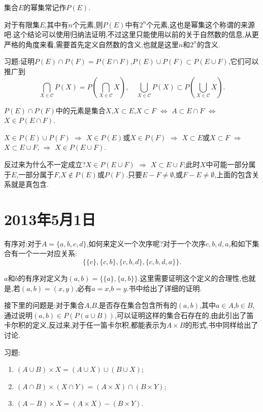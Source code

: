 \documentclass[12pt,a4paper,openany]{book}
\begin{document}
集合$E$的幂集常记作$P(E)$.

对于有限集$E$,其中有$n$个元素,则$P(E)$中有$2^n$个元素,这也是幂集这个称谓的来源吧.这个结论可以使用归纳法证明,不过这里只能使用以前的关于自然数的信息,从更严格的角度来看,需要首先定义自然数的含义,也就是这里$n$和$2^n$的含义.

习题:证明$P(E) \cap P(F) = P(E \cap F)$,$P(E) \cup P(F) \subset P(E \cup F)$,它们可以推广到
\[
\bigcap_{X \in \mathscr{C}}{P(X)} = P(\bigcap_{X \in \mathscr{C}}{X}),\quad \bigcup_{X \in \mathscr{C}}{P(X)} \subset P(\bigcup_{X \in \mathscr{C}}{X}).
\]

$P(E) \cap P(F)$中的元素是集合$X$,$X \subset E$,$X \subset F$ $\Leftrightarrow$ $A \subset E \cap F$ $\Leftrightarrow$ $X \in P(E \cap F)$.

$X \in P(E) \cup P(F)$ $\Rightarrow$ $X \in P(E)$或$X \in P(F)$ $\Rightarrow$ $X \subset E$或$X \subset F$ $\Rightarrow$ $X \subset E \cup F$, $\Rightarrow$ $X \in P(E \cup F)$.

反过来为什么不一定成立?$X \in P(E \cup F)$ $\Rightarrow$ $X \subset E \cup F$;此时$X$中可能一部分属于$E$,一部分属于$F$,$X \notin P(E)$或$P(F)$.只要$E-F\neq \emptyset$,或$F-E \neq \emptyset$,上面的包含关系就是真包含.

\section{2013年5月1日}
有序对:对于$A=\{a,b,c,d\}$,如何来定义一个次序呢?对于一个次序$c,b,d,a$,和如下集合有一个一一对应关系:
\[
\{\{c\},\{c,b\},\{c,b,d\},\{c,b,d,a\}\}.
\]

$a$和$b$的有序对定义为$(a,b)=\{\{a\}, \{a,b\}\}$.这里需要证明这个定义的合理性,也就是,若$(a,b)=(x,y)$,必有$a=x$,$b=y$.书中给出了详细的证明.

接下里的问题是:对于集合$A$,$B$,是否存在集合包含所有的$(a,b)$,其中$a \in A$,$b \in B$,通过说明$(a,b) \in P(P(a \cup B))$,可以证明这样的集合石存在的,由此引出了笛卡尔积的定义,反过来,对于任一笛卡尔积,都能表示为$A \times B$的形式,书中同样给出了讨论.

习题:
\begin{enumerate}
\item $(A \cup B) \times X = (A \cup X) \cup (B \cup X)$;
\item $(A \cap B) \times (X \cap Y) = (A \times X) \cap (B \times Y)$;
\item $(A-B) \times X = (A \times X) - (B \times Y)$.
\end{enumerate}
\end{document}
